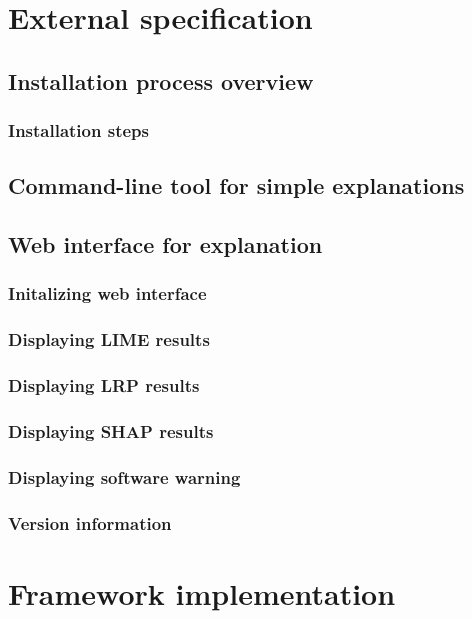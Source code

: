 \documentclass[
    bindingoffset=5mm,  %
    footnoteindent=3mm, %
    hyphenation=true    %
]{src/wut-thesis}
\begin{document}
\section{External specification} \label{ch:externalSpec}

\subsection{Installation process overview}
\subsubsection{Installation steps}

\subsection{Command-line tool for simple explanations}

\subsection{Web interface for explanation}
\subsubsection{Initalizing web interface}
\subsubsection{Displaying LIME results}
\subsubsection{Displaying LRP results}
\subsubsection{Displaying SHAP results}
\subsubsection{Displaying software warning}
\subsubsection{Version information}

%
%
\clearpage %
\section{Framework implementation} \label{ch:implementation}
\end{document}
